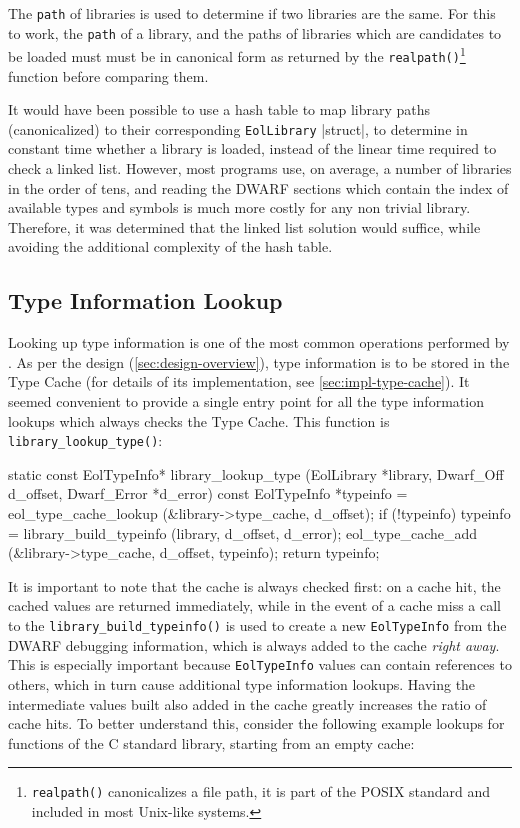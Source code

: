 The \verb|path| of libraries is used to determine if two libraries are the
same. For this to work, the \verb|path| of a library, and the paths of
libraries which are candidates to be loaded must must be in canonical form
as returned by the \verb|realpath()|\footnote{\texttt{realpath()}
canonicalizes a file path, it is part of the POSIX standard and included in
most Unix-like systems.} function before comparing them.

It would have been possible to use a hash table to map library paths
(canonicalized) to their corresponding \verb|EolLibrary| \Mc|struct|, to
determine in constant time whether a library is loaded, instead of the linear
time required to check a linked list. However, most programs use, on average,
a number of libraries in the order of tens, and reading the DWARF sections
which contain the index of available types and symbols is much more costly for
any non trivial library. Therefore, it was determined that the linked list
solution would suffice, while avoiding the additional complexity of the hash
table.


\subsection{Type Information Lookup}

Looking up type information is one of the most common operations performed by
\Eol*. As per the design (\autoref{sec:design-overview}), type information is
to be stored in the \textsf{Type Cache} (for details of its implementation,
see \autoref{sec:impl-type-cache}). It seemed convenient to provide a single
entry point for all the type information lookups which always checks the
\textsf{Type Cache}. This function is \verb|library_lookup_type()|:

\begin{ccode}
static const EolTypeInfo*
library_lookup_type (EolLibrary  *library,
                     Dwarf_Off    d_offset,
                     Dwarf_Error *d_error) {
    const EolTypeInfo *typeinfo =
            eol_type_cache_lookup (&library->type_cache, d_offset);
    if (!typeinfo) {
        typeinfo = library_build_typeinfo (library, d_offset, d_error);
        eol_type_cache_add (&library->type_cache, d_offset, typeinfo);
    }
    return typeinfo;
}
\end{ccode}

It is important to note that the cache is always checked first: on a cache
hit, the cached values are returned immediately, while in the event of a cache
miss a call to the \verb|library_build_typeinfo()| is used to create a new
\verb|EolTypeInfo| from the DWARF debugging information, which is always added
to the cache \emph{right away}. This is especially important because
\verb|EolTypeInfo| values can contain references to others, which in turn
cause additional type information lookups. Having the intermediate values
built also added in the cache greatly increases the ratio of cache hits. To
better understand this, consider the following example lookups for functions
of the C standard library, starting from an empty cache:


